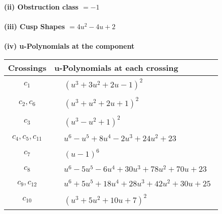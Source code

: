 \documentclass[1p]{elsarticle_modified}
\theoremstyle{definition}
\begin{document}
\flushleft \textbf{(ii) Obstruction class $= -1$}\\~\\
\flushleft \textbf{(iii) Cusp Shapes $= 4 u^2-4 u+2$}\\~\\
\newpage\renewcommand{\arraystretch}{1}
\flushleft \textbf{(iv) u-Polynomials at the component}\newline \\
\begin{tabular}{m{50pt}|m{274pt}}
Crossings & \hspace{64pt}u-Polynomials at each crossing \\
\hline $$\begin{aligned}c_{1}\end{aligned}$$&$\begin{aligned}
&(u^3+3 u^2+2 u-1)^2
\end{aligned}$\\
\hline $$\begin{aligned}c_{2},c_{6}\end{aligned}$$&$\begin{aligned}
&(u^3+u^2+2 u+1)^2
\end{aligned}$\\
\hline $$\begin{aligned}c_{3}\end{aligned}$$&$\begin{aligned}
&(u^3- u^2+1)^2
\end{aligned}$\\
\hline $$\begin{aligned}c_{4},c_{5},c_{11}\end{aligned}$$&$\begin{aligned}
&u^6- u^5+8 u^4-2 u^3+24 u^2+23
\end{aligned}$\\
\hline $$\begin{aligned}c_{7}\end{aligned}$$&$\begin{aligned}
&(u-1)^6
\end{aligned}$\\
\hline $$\begin{aligned}c_{8}\end{aligned}$$&$\begin{aligned}
&u^6-5 u^5-6 u^4+30 u^3+78 u^2+70 u+23
\end{aligned}$\\
\hline $$\begin{aligned}c_{9},c_{12}\end{aligned}$$&$\begin{aligned}
&u^6+5 u^5+18 u^4+28 u^3+42 u^2+30 u+25
\end{aligned}$\\
\hline $$\begin{aligned}c_{10}\end{aligned}$$&$\begin{aligned}
&(u^3+5 u^2+10 u+7)^2
\end{aligned}$\\
\hline
\end{tabular}\\~\\
\end{document}
